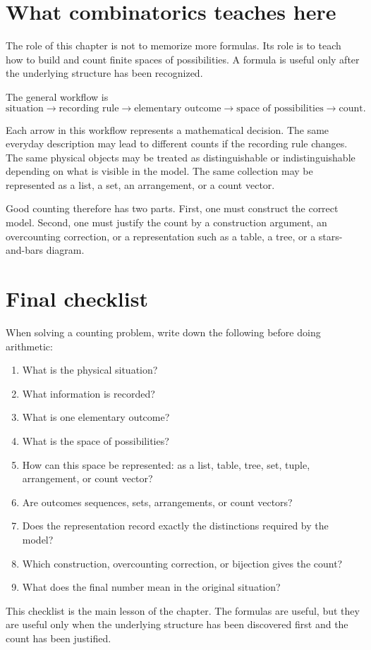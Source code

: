 \section{What combinatorics teaches here}

The role of this chapter is not to memorize more formulas. Its role is to teach how to build and count finite spaces of possibilities. A formula is useful only after the underlying structure has been recognized.

The general workflow is
\[
\text{situation}
\longrightarrow
\text{recording rule}
\longrightarrow
\text{elementary outcome}
\longrightarrow
\text{space of possibilities}
\longrightarrow
\text{count}.
\]

Each arrow in this workflow represents a mathematical decision. The same everyday description may lead to different counts if the recording rule changes. The same physical objects may be treated as distinguishable or indistinguishable depending on what is visible in the model. The same collection may be represented as a list, a set, an arrangement, or a count vector.

Good counting therefore has two parts. First, one must construct the correct model. Second, one must justify the count by a construction argument, an overcounting correction, or a representation such as a table, a tree, or a stars-and-bars diagram.

\section{Final checklist}

When solving a counting problem, write down the following before doing arithmetic:

\begin{enumerate}
    \item What is the physical situation?
    \item What information is recorded?
    \item What is one elementary outcome?
    \item What is the space of possibilities?
    \item How can this space be represented: as a list, table, tree, set, tuple, arrangement, or count vector?
    \item Are outcomes sequences, sets, arrangements, or count vectors?
    \item Does the representation record exactly the distinctions required by the model?
    \item Which construction, overcounting correction, or bijection gives the count?
    \item What does the final number mean in the original situation?
\end{enumerate}

This checklist is the main lesson of the chapter. The formulas are useful, but they are useful only when the underlying structure has been discovered first and the count has been justified.

